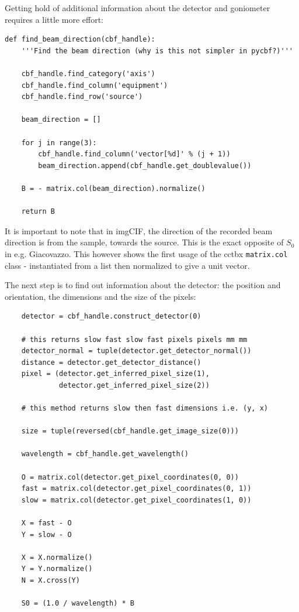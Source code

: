 \documentclass[a4paper, 11pt]{article}
\begin{document}
\noindent
Getting hold of additional information about the detector and goniometer requires a little more effort:

{\small
\begin{verbatim}
def find_beam_direction(cbf_handle):
    '''Find the beam direction (why is this not simpler in pycbf?)'''

    cbf_handle.find_category('axis')
    cbf_handle.find_column('equipment')
    cbf_handle.find_row('source')

    beam_direction = []

    for j in range(3):
        cbf_handle.find_column('vector[%d]' % (j + 1))
        beam_direction.append(cbf_handle.get_doublevalue())

    B = - matrix.col(beam_direction).normalize()

    return B
\end{verbatim}
}

\noindent
It is important to note that in imgCIF, the direction of the recorded beam direction is from the sample, towards the source. This is the exact opposite of $S_0$ in e.g. Giacovazzo. This however shows the first usage of the cctbx \verb|matrix.col| class - instantiated from a list then normalized to give a unit vector.

The next step is to find out information about the detector: the position and orientation, the dimensions and the size of the pixels:

{\small
\begin{verbatim}
    detector = cbf_handle.construct_detector(0)

    # this returns slow fast slow fast pixels pixels mm mm
    detector_normal = tuple(detector.get_detector_normal())
    distance = detector.get_detector_distance()
    pixel = (detector.get_inferred_pixel_size(1),
             detector.get_inferred_pixel_size(2))

    # this method returns slow then fast dimensions i.e. (y, x)

    size = tuple(reversed(cbf_handle.get_image_size(0)))

    wavelength = cbf_handle.get_wavelength()

    O = matrix.col(detector.get_pixel_coordinates(0, 0))
    fast = matrix.col(detector.get_pixel_coordinates(0, 1))
    slow = matrix.col(detector.get_pixel_coordinates(1, 0))

    X = fast - O
    Y = slow - O

    X = X.normalize()
    Y = Y.normalize()
    N = X.cross(Y)

    S0 = (1.0 / wavelength) * B
\end{verbatim}
}
\end{document}
